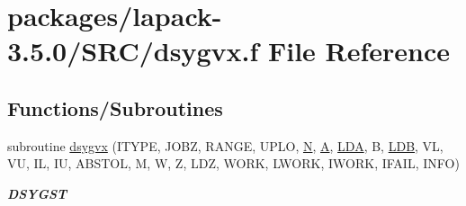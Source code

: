 \hypertarget{dsygvx_8f}{}\section{packages/lapack-\/3.5.0/\+S\+R\+C/dsygvx.f File Reference}
\label{dsygvx_8f}
\subsection*{Functions/\+Subroutines}
\begin{DoxyCompactItemize}
\item 
subroutine \hyperlink{group__doubleSYeigen_ga51bef2d9d58cfff3f1bac9143ccc85b8}{dsygvx} (I\+T\+Y\+P\+E, J\+O\+B\+Z, R\+A\+N\+G\+E, U\+P\+L\+O, \hyperlink{polmisc_8c_a0240ac851181b84ac374872dc5434ee4}{N}, \hyperlink{classA}{A}, \hyperlink{example__user_8c_ae946da542ce0db94dced19b2ecefd1aa}{L\+D\+A}, B, \hyperlink{example__user_8c_a50e90a7104df172b5a89a06c47fcca04}{L\+D\+B}, V\+L, V\+U, I\+L, I\+U, A\+B\+S\+T\+O\+L, M, W, Z, L\+D\+Z, W\+O\+R\+K, L\+W\+O\+R\+K, I\+W\+O\+R\+K, I\+F\+A\+I\+L, I\+N\+F\+O)
\begin{DoxyCompactList}\small\item\em {\bfseries D\+S\+Y\+G\+S\+T} \end{DoxyCompactList}\end{DoxyCompactItemize}
